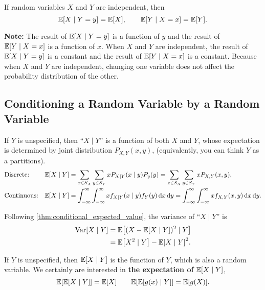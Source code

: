 \begin{theorem}
    If random variables $X$ and $Y$ are independent, then
    \[\E{X\mid Y=y}=\E{X}, \qquad \E{Y\mid X=x}=\E{Y}.\]
\end{theorem}
\textbf{Note:} The result of $\E{X\mid Y=y}$ is a function of $y$ and the result of $\E{Y\mid X=x}$ is a function of $x$. When $X$ and $Y$ are independent, the result of $\E{X\mid Y=y}$ is a constant and the result of $\E{Y\mid X=x}$ is a constant. Because when $X$ and $Y$ are independent, changing one variable does not affect the probability distribution of the other.

\subsection{Conditioning a Random Variable by a Random Variable}
\begin{theorem}\label{thm:conditional_expected_value}
    If $Y$ is unspecified, then ``$X\mid Y$'' is a function of both $X$ and $Y$, whose expectation is determined by joint distribution $P_{X,Y}(x,y)$, (equivalently, you can think $Y$ as a partitions).
    \begin{align*}
        &\text{Discrete:}& \E{X\mid Y}&=\sum_{x\in S_X}\sum_{y\in S_Y}xP_{X\mid Y}(x\mid y)P_y(y)=\sum_{x\in S_X}\sum_{y\in S_Y}xP_{X, Y}(x, y), \\
        &\text{Continuous:}& \E{X\mid Y}&=\int_{-\infty}^{\infty}\int_{-\infty}^{\infty}xf_{X\mid Y}(x\mid y)f_Y(y)\diff x\diff y=\int_{-\infty}^{\infty}\int_{-\infty}^{\infty}xf_{X, Y}(x, y)\diff x\diff y.
    \end{align*}
\end{theorem}

\begin{theorem}
    Following \cref{thm:conditional_expected_value}, the variance of ``$X\mid Y$'' is
    \begin{align*}
        \Var[X\mid Y]
        &= \E{(X-\E{X\mid Y})^2\mid Y} \\
        &= \E{X^2\mid Y}-\E{X\mid Y}^2 .
    \end{align*}
\end{theorem}

\begin{theorem}
    \label{thm:iterated_expectation}
    If $Y$ is unspecified, then $\E{X\mid Y}$ is the function of $Y$, which is also a random variable. We certainly are interested in \textbf{the expectation of} $\E{X\mid Y}$,
    \[\E{\E{X\mid Y}}=\E{X} \qquad \E{\E{g(x)\mid Y}}=\E{g(X)}.\]
\end{theorem}

